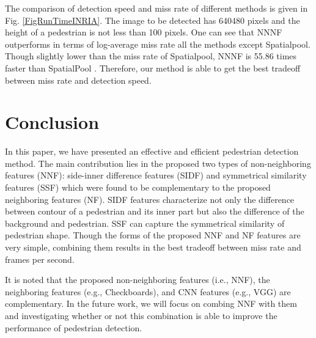 \documentclass[10pt,twocolumn,letterpaper]{article}
\begin{document}
The comparison of detection speed and miss rate of different methods is 
given in Fig. \ref{FigRunTimeINRIA}. The image to be detected has 640480 pixels and the 
height of a pedestrian is not less than 100 pixels. One can see that NNNF outperforms in terms of log-average miss rate all the 
methods except Spatialpool. Though slightly lower than the miss rate of 
Spatialpool, NNNF is 55.86 times faster than SpatialPool \cite{Paisitkriangkrai_SpatialPool_ECCV_2014}. Therefore, our 
method is able to get the best tradeoff between miss rate and detection 
speed.


\section{Conclusion}
In this paper, we have presented an effective and efficient pedestrian detection method. The main contribution lies in the proposed two types of non-neighboring features (NNF): side-inner difference features (SIDF) and symmetrical similarity features (SSF) which were found to be complementary to the proposed neighboring features (NF). SIDF features characterize not only the difference between contour of a pedestrian and its inner part but also the difference of the background and pedestrian. SSF can capture the symmetrical similarity of pedestrian shape. Though the forms of the proposed NNF and NF features are very simple, combining them results in the best tradeoff between miss rate and frames per second.

It is noted that the proposed non-neighboring features (i.e., NNF), the neighboring features (e.g., Checkboards), and CNN features (e.g., VGG) are complementary. In the future work, we will focus on combing NNF with them and investigating whether or not this combination is able to improve the performance of pedestrian detection.



{\small


}
\end{document}
